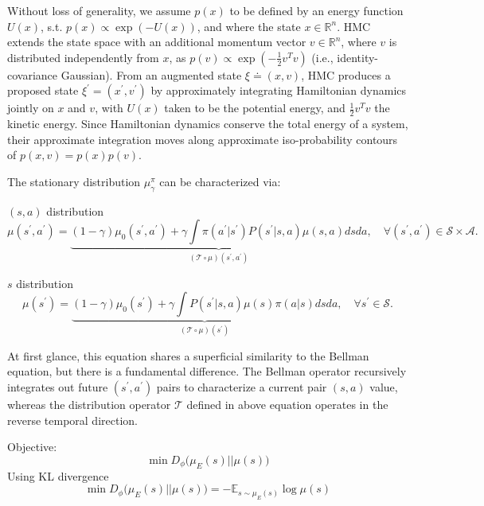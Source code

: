 Without loss of generality, we assume $p(x)$ to be defined by an energy function $U(x)$, s.t. $p(x)\propto \exp(-U(x))$, and where the state $x\in \mathbb{R}^n$. HMC extends the state space with an additional momentum vector $v\in\mathbb{R}^n$, where $v$ is distributed independently from $x$, as $p(v)\propto \exp(-\frac{1}{2}v^T v)$ (i.e., identity-covariance Gaussian). From an augmented state $\xi\doteq (x, v)$, HMC produces a proposed state $\xi^\prime = (x^\prime, v^\prime)$ by approximately integrating Hamiltonian dynamics jointly on $x$ and $v$, with $U(x)$ taken to be the potential energy, and $\frac{1}{2}v^T v$ the kinetic energy. Since Hamiltonian dynamics conserve the total energy of a system, their approximate integration moves along approximate iso-probability contours of $p(x, v)=p(x)p(v)$. 

The stationary distribution $\mu_{\gamma}^{\pi}$ can be characterized via:

$(s, a)$ distribution
\begin{equation}
\mu(s^\prime, a^\prime) = \underbrace{(1-\gamma) \mu_{0}(s^\prime, a^\prime) + \gamma \int \pi(a^\prime|s^\prime) P(s^\prime|s, a) \mu(s, a) ds da}_{(\mathcal{T}\circ \mu) (s^\prime, a^\prime)}, \quad \forall (s^\prime, a^\prime)\in \mathcal{S}\times\mathcal{A}. 
\end{equation}

$s$ distribution
\begin{equation}
\mu(s^\prime) = \underbrace{(1-\gamma) \mu_{0}(s^\prime) + \gamma \int P(s^\prime|s, a) \mu(s) \pi(a|s) ds da}_{(\mathcal{T}\circ \mu) (s^\prime)}, \quad \forall s^\prime \in \mathcal{S}. 
\end{equation}

At first glance, this equation shares a superficial similarity to the Bellman equation, but there is a fundamental difference. The Bellman operator recursively integrates out future $(s^\prime, a^\prime)$ pairs to characterize a current pair $(s, a)$ value, whereas the distribution operator $\mathcal{T}$ defined in above equation operates in the reverse temporal direction. 

Objective:
\begin{equation}
\min D_{\phi}\big( \mu_E(s) || \mu(s) \big)
\end{equation}
Using KL divergence
\begin{equation}
\min D_{\phi}\big( \mu_E(s) || \mu(s) \big) = -\mathbb{E}_{s\sim \mu_E(s)} \log \mu(s)
\end{equation}

